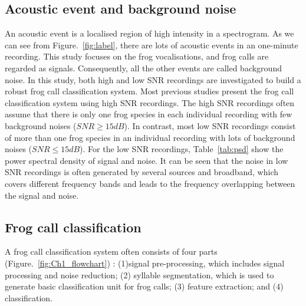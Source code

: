 \subsection{Acoustic event and background noise}
An acoustic event is a localised region of high intensity in a spectrogram. As we can see from Figure.~\ref{fig:label}, there are lots of acoustic events in an one-minute recording. This study focuses on the frog vocalisations, and frog calls are regarded as signals. Consequently, all the other events are called background noise. 
In this study, both high and low SNR recordings are investigated to build a robust frog call classification system. Most previous studies present the frog call classification system using high SNR recordings. The high SNR recordings often assume that there is only one frog species in each individual recording with few background noises ($SNR \geq 15 dB$). In contrast, most low SNR recordings consist of more than one frog species in an individual recording with lots of background noises ($SNR \leq 15 dB$). 
For the low SNR recordings, Table~\ref{tab:psd} show the power spectral density of signal and noise. It can be seen that the noise in low SNR recordings is often generated by several sources and broadband, which covers different frequency bands and leads to the frequency overlapping between the signal and noise. 







\subsection{Frog call classification}

A frog call classification system often consists of four parts (Figure.~\ref{fig:Ch1_flowchart}) : (1)signal pre-processing, which includes signal processing and noise reduction; (2) syllable segmentation, which is used to generate basic classification unit for frog calls; (3) feature extraction; and (4) classification.  



